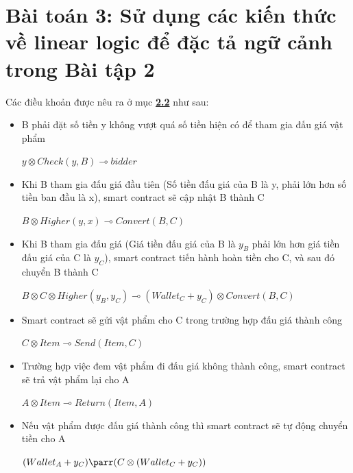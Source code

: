 \documentclass[a4paper]{article}
\begin{document}
\section{Bài toán 3: Sử dụng các kiến thức về linear logic để đặc tả ngữ cảnh trong Bài tập 2}
Các điều khoản được nêu ra ở mục \hyperref[dieukhoan]{\textbf{2.2}} như sau:
\begin{itemize}
    \item B phải đặt số tiền y không vượt quá số tiền hiện có để tham gia đấu giá vật phẩm\\
    \begin{center}
        $y \otimes Check(y,B) \multimap bidder$
    \end{center}
    
    \item Khi B tham gia đấu giá đầu tiên (Số tiền đấu giá của B là y, phải lớn hơn số tiền ban đầu là x), smart contract sẽ cập nhật B thành C\\
    \begin{center}
        $B \otimes Higher(y,x) \multimap Convert(B, C)$
    \end{center}
    
    \item Khi B tham gia đấu giá (Giá tiền đấu giá của B là $y_{B}$ phải lớn hơn giá tiền đấu giá của C là $y_{C}$), smart contract tiến hành hoàn tiền cho C, và sau đó chuyển B thành C\\
    \begin{center}
        $B \otimes C \otimes Higher(y_{B}, y_{C}) \multimap (Wallet_{C} + y_{C}) \otimes Convert(B,C)$
    \end{center}
    
    \item Smart contract sẽ gửi vật phẩm cho C trong trường hợp đấu giá thành công\\
    \begin{center}
        $C \otimes Item \multimap Send(Item,C)$
    \end{center}
    
    \item Trường hợp việc đem vật phẩm đi đấu giá không thành công, smart contract sẽ trả vật phẩm lại cho A\\
    \begin{center}
        $A \otimes Item \multimap Return(Item,A)$
    \end{center}
    
    \item Nếu vật phẩm được đấu giá thành công thì smart contract sẽ tự động chuyển tiền cho A\\
    \begin{center}
        $(Wallet_{A} + y_{C}) \parr (C \otimes (Wallet_{C} + y_{C}))$
    \end{center}
    

\end{itemize}
\end{document}

